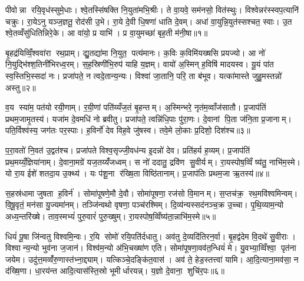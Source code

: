 
\clearpage
{}
\setcounter{anuvakam}{0}
पीवोन्ना रयि॒वृध॑स्सुमे॒धाः। श्वे॒तस्सि॑षक्ति नि॒युता॑मभि॒श्रीः। ते वा॒यवे॒ सम॑नसो॒ वित॑स्थुः। विश्वेन्नर॑स्स्वप॒त्यानि॑ चक्रुः। रा॒येऽनु यञ्ज॒ज्ञतू॒ रोद॑सी उ॒भे। रा॒ये दे॒वी धि॒षणा॑ धाति दे॒वम्। अधा॑ वा॒युन्नि॒युत॑स्सश्चत॒ स्वाः। उ॒त श्वे॒तव्वँसु॑धितिन्निरे॒के। आ वा॑यो॒ प्र याभि॑। प्र वा॒युमच्छा॑ बृह॒ती म॑नी॒षा॥१॥

बृ॒हद्र॑यिव्विँ॒श्ववा॑रा रथ॒प्राम्। द्यु॒तद्या॑मा नि॒युत॒ पत्य॑मानः। क॒विः क॒विमि॑यख्षसि प्रयज्यो। आ नो॑ नि॒युद्भि॑श्श॒तिनी॑भिरध्व॒रम्। स॒ह॒स्रिणी॑भि॒रुप॑ याहि य॒ज्ञम्। वायो॑ अ॒स्मिन् ह॒विषि॑ मादयस्व। यू॒यं पा॑त स्व॒स्तिभि॒स्सदा॑ नः। प्रजा॑पते॒ न त्वदे॒तान्य॒न्यः। विश्वा॑ जा॒तानि॒ परि॒ ता ब॑भूव। यत्का॑मास्ते जुहु॒मस्तन्नो॑ अस्तु॥२॥

व॒य स्या॑म॒ पत॑यो रयी॒णाम्। र॒यी॒णां पति॑य्यँज॒तं बृ॒हन्तम्। अ॒स्मिन्भरे॒ नृत॑म॒व्वाँज॑सातौ। प्र॒जाप॑तिं प्रथम॒जामृ॒तस्य॑। यजा॑म दे॒वमधि॑ नो ब्रवीतु। प्रजा॑पते॒ त्वन्नि॑धि॒पाः पु॑रा॒णः। दे॒वानां पि॒ता ज॑नि॒ता प्र॒जानाम्। पति॒र्विश्व॑स्य॒ जग॑तः पर॒स्पाः। ह॒विर्नो॑ देव विह॒वे जु॑षस्व। तवे॒मे लो॒काः प्र॒दिशो॒ दिश॑श्च॥३॥

प॒रा॒वतो॑ नि॒वत॑ उ॒द्वत॑श्च। प्रजा॑पते विश्व॒सृज्जी॒वध॑न्य इ॒दन्नो॑ देव। प्रति॑हर्य ह॒व्यम्। प्र॒जाप॑तिं प्रथ॒मय्यँ॒ज्ञिया॑नाम्। दे॒वाना॒मग्रे॑ यज॒तय्यँ॑जध्वम्। स नो॑ ददातु॒ द्रवि॑ण सु॒वीर्यम्। रा॒यस्पोष॒व्विँ ष्य॑तु॒ नाभि॑म॒स्मे। यो रा॒य ईशे॑ शतदा॒य उ॒क्थ्य॑। यः प॑शू॒ना र॑ख्षि॒ता विष्ठि॑तानाम्। प्र॒जाप॑तिः प्रथम॒जा ऋ॒तस्य॑॥४॥

स॒हस्र॑धामा जुषता ह॒विर्न॑। सोमा॑पूषणे॒मौ दे॒वौ। सोमा॑पूषणा॒ रज॑सो वि॒मानम्। स॒प्तच॑क्र॒ रथ॒मवि॑श्वमिन्वम्। वि॒षू॒वृतं॒ मन॑सा यु॒ज्यमा॑नम्। तञ्जि॑न्वथो वृषणा॒ पञ्च॑रश्मिम्। दि॒व्य॑न्यस्सद॑नञ्च॒क्र उ॒च्चा। पृ॒थि॒व्याम॒न्यो अध्य॒न्तरि॑ख्षे। ताव॒स्मभ्यं॑ पुरु॒वारं॑ पुरु॒ख्षुम्। रा॒यस्पोष॒व्विँष्य॑ता॒न्नाभि॑म॒स्मे॥५॥

धियं॑ पू॒षा जि॑न्वतु विश्वमि॒न्वः। र॒यि सोमो॑ रयि॒पति॑र्दधातु। अव॑तु दे॒व्यदि॑तिरन॒र्वा। बृ॒हद्व॑देम वि॒दथे॑ सु॒वीराः। विश्वान्य॒न्यो भुव॑ना ज॒जान॑। विश्व॑म॒न्यो अ॑भि॒चख्षा॑ण एति। सोमा॑पूषणा॒वव॑त॒न्धियं॑ मे। यु॒वभ्या॒व्विँश्वा॒ पृत॑ना जयेम। उदु॑त्त॒मव्वँ॑रु॒णास्त॑भ्ना॒द्द्याम्। यत्किञ्चे॒दङ्कि॑त॒वास॑। अव॑ ते॒ हेड॒स्तत्त्वा॑ यामि। आ॒दि॒त्याना॒मव॑सा॒ न द॑ख्षि॒णा। धा॒रय॑न्त आदि॒त्यास॑स्ति॒स्रो भूमीर्धारयन्न्। य॒ज्ञो दे॒वाना॒ शुचि॑र॒पः॥६॥\anuvakamend[म॒नी॒षाऽस्तु॑ च॒र्तस्या॒स्मे कि॑त॒वास॑श्च॒त्वारि॑ च]

